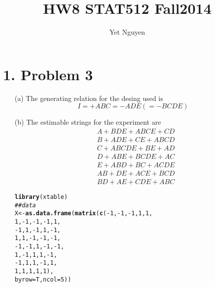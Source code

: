 \documentclass{article}\usepackage[]{graphicx}\usepackage[]{color}
\makeatletter
\newcommand{\hlnum}[1]{\textcolor[rgb]{0.686,0.059,0.569}{#1}}%
\newcommand{\hlcom}[1]{\textcolor[rgb]{0.678,0.584,0.686}{\textit{#1}}}%
\newcommand{\hlopt}[1]{\textcolor[rgb]{0,0,0}{#1}}%
\newcommand{\hlstd}[1]{\textcolor[rgb]{0.345,0.345,0.345}{#1}}%
\newcommand{\hlkwb}[1]{\textcolor[rgb]{0.69,0.353,0.396}{#1}}%
\newcommand{\hlkwc}[1]{\textcolor[rgb]{0.333,0.667,0.333}{#1}}%
\newcommand{\hlkwd}[1]{\textcolor[rgb]{0.737,0.353,0.396}{\textbf{#1}}}%
\newenvironment{kframe}{%
 \def\at@end@of@kframe{}%
 \ifinner\ifhmode%
  \def\at@end@of@kframe{\end{minipage}}%
  \begin{minipage}{\columnwidth}%
 \fi\fi%
 \def\FrameCommand##1{\hskip\@totalleftmargin \hskip-\fboxsep
 \colorbox{shadecolor}{##1}\hskip-\fboxsep
     \hskip-\linewidth \hskip-\@totalleftmargin \hskip\columnwidth}%
 \MakeFramed {\advance\hsize-\width
   \@totalleftmargin\z@ \linewidth\hsize
   \@setminipage}}%
 {\par\unskip\endMakeFramed%
 \at@end@of@kframe}
\makeatother
\begin{document}
\title{HW8 STAT512 Fall2014}

\author{Yet Nguyen}
  
\maketitle

\section*{1. Problem 3}
\begin{itemize}
\item[(a)] The generating relation for the desing used is 
\[
I = +ABC = -ADE (= -BCDE)
\]

\item[(b)] The estimable strings for the experiment are
\begin{align*}
& A + BDE + ABCE + CD\\
& B +ADE + CE + ABCD\\
& C+ ABCDE + BE + AD\\
& D + ABE +BCDE + AC\\
& E + ABD + BC + ACDE\\
& AB +DE +ACE +BCD\\
& BD + AE+CDE + ABC
\end{align*}
\begin{kframe}
\begin{alltt}
\hlkwd{library}\hlstd{(xtable)}
\hlcom{## data}
\hlstd{X} \hlkwb{<-}\hlkwd{as.data.frame}\hlstd{(} \hlkwd{matrix}\hlstd{(}\hlkwd{c}\hlstd{(}\hlopt{-}\hlnum{1}\hlstd{,} \hlopt{-}\hlnum{1}\hlstd{,} \hlopt{-}\hlnum{1}\hlstd{,} \hlnum{1}\hlstd{,} \hlnum{1}\hlstd{,}
              \hlnum{1}\hlstd{,} \hlopt{-}\hlnum{1}\hlstd{,} \hlopt{-}\hlnum{1}\hlstd{,} \hlopt{-}\hlnum{1}\hlstd{,} \hlnum{1}\hlstd{,}
              \hlopt{-}\hlnum{1}\hlstd{,} \hlnum{1}\hlstd{,} \hlopt{-}\hlnum{1}\hlstd{,} \hlnum{1}\hlstd{,} \hlopt{-}\hlnum{1}\hlstd{,}
              \hlnum{1}\hlstd{,} \hlnum{1}\hlstd{,} \hlopt{-}\hlnum{1}\hlstd{,} \hlopt{-}\hlnum{1}\hlstd{,} \hlopt{-}\hlnum{1}\hlstd{,}
              \hlopt{-}\hlnum{1}\hlstd{,} \hlopt{-}\hlnum{1}\hlstd{,} \hlnum{1}\hlstd{,} \hlopt{-}\hlnum{1}\hlstd{,} \hlopt{-}\hlnum{1}\hlstd{,}
              \hlnum{1}\hlstd{,} \hlopt{-}\hlnum{1}\hlstd{,} \hlnum{1}\hlstd{,} \hlnum{1}\hlstd{,} \hlopt{-}\hlnum{1}\hlstd{,}
              \hlopt{-}\hlnum{1}\hlstd{,} \hlnum{1}\hlstd{,} \hlnum{1}\hlstd{,} \hlopt{-}\hlnum{1}\hlstd{,} \hlnum{1}\hlstd{,}
              \hlnum{1}\hlstd{,} \hlnum{1}\hlstd{,} \hlnum{1}\hlstd{,} \hlnum{1}\hlstd{,} \hlnum{1}\hlstd{),}
            \hlkwc{byrow} \hlstd{= T,} \hlkwc{ncol} \hlstd{=} \hlnum{5}\hlstd{))}


\end{alltt}
\end{kframe}
\end{itemize}
\end{document}
